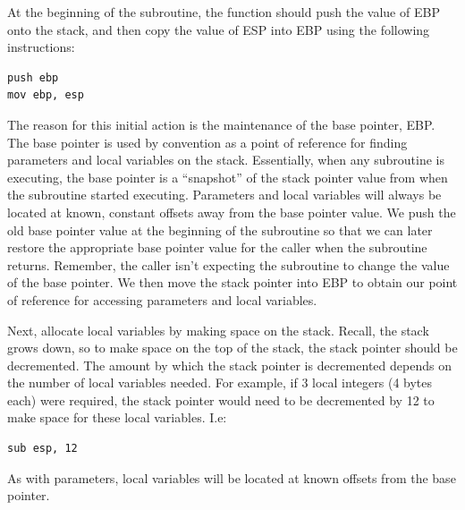 \begin{numlist}

\item At the beginning of the subroutine, the function should push the
  value of EBP onto the stack, and then copy the value of ESP into EBP
  using the following instructions:

\begin{lstlisting}[backgroundcolor=\color{white},frame=trBL,linewidth=3.75in,xleftmargin=2.25in,label={x86-callee-code-1.lst},language={[x86masm]Assembler},caption={x86 callee code, part 1}]
push ebp
mov ebp, esp
\end{lstlisting}

The reason for this initial action is the maintenance of the base
pointer, EBP. The base pointer is used by convention as a point of
reference for finding parameters and local variables on the stack.
Essentially, when any subroutine is executing, the base pointer is a
``snapshot'' of the stack pointer value from when the subroutine
started executing. Parameters and local variables will always be
located at known, constant offsets away from the base pointer value.
We push the old base pointer value at the beginning of the subroutine
so that we can later restore the appropriate base pointer value for
the caller when the subroutine returns. Remember, the caller isn't
expecting the subroutine to change the value of the base pointer. We
then move the stack pointer into EBP to obtain our point of reference
for accessing parameters and local variables.

\item Next, allocate local variables by making space on the stack.
  Recall, the stack grows down, so to make space on the top of the
  stack, the stack pointer should be decremented. The amount by which
  the stack pointer is decremented depends on the number of local
  variables needed. For example, if 3 local integers (4 bytes each)
  were required, the stack pointer would need to be decremented by 12
  to make space for these local variables. I.e:

\begin{lstlisting}[backgroundcolor=\color{white},frame=trBL,linewidth=3.75in,xleftmargin=2.25in,label={x86-callee-code-2.lst},language={[x86masm]Assembler},caption={x86 callee code, part 2}]
sub esp, 12
\end{lstlisting}

As with parameters, local variables will be located at known offsets
from the base pointer.


\end{numlist}

